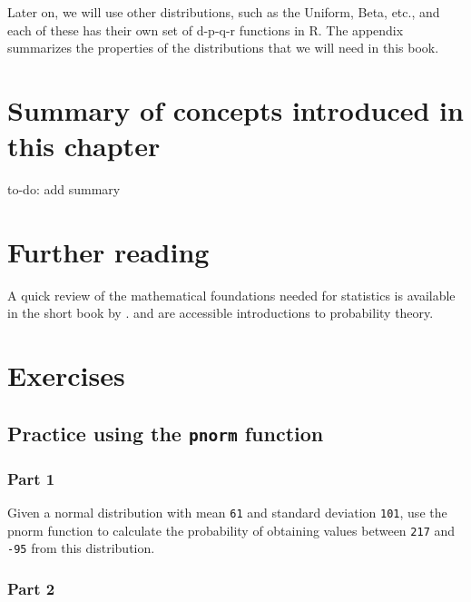 \documentclass[12pt,]{krantz}
\theoremstyle{definition}
\theoremstyle{definition}
\theoremstyle{definition}
\theoremstyle{remark}
\let\BeginKnitrBlock\begin \let\EndKnitrBlock\end
\begin{document}
Later on, we will use other distributions, such as the Uniform, Beta, etc., and each of these has their own set of d-p-q-r functions in R. The appendix summarizes the properties of the distributions that we will need in this book.

\hypertarget{summary-of-concepts-introduced-in-this-chapter}{%
\section{Summary of concepts introduced in this chapter}\label{summary-of-concepts-introduced-in-this-chapter}}

\BeginKnitrBlock{rmdnote}
to-do: add summary
\EndKnitrBlock{rmdnote}

\hypertarget{further-reading}{%
\section{Further reading}\label{further-reading}}

A quick review of the mathematical foundations needed for statistics is available in the short book by \citet{fox2009mathematical}. \citet{morin2016probability} and \citet{blitzstein2014introduction} are accessible introductions to probability theory.

\hypertarget{exercises}{%
\section{Exercises}\label{exercises}}

\hypertarget{practice-using-the-pnorm-function}{%
\subsection{\texorpdfstring{Practice using the \texttt{pnorm} function}{Practice using the pnorm function}}\label{practice-using-the-pnorm-function}}

\hypertarget{part-1}{%
\subsubsection{Part 1}\label{part-1}}

Given a normal distribution with mean \texttt{61} and standard deviation \texttt{101}, use the pnorm function to calculate the probability of obtaining values between \texttt{217} and \texttt{-95} from this distribution.

\hypertarget{part-2}{%
\subsubsection{Part 2}\label{part-2}}
\end{document}

